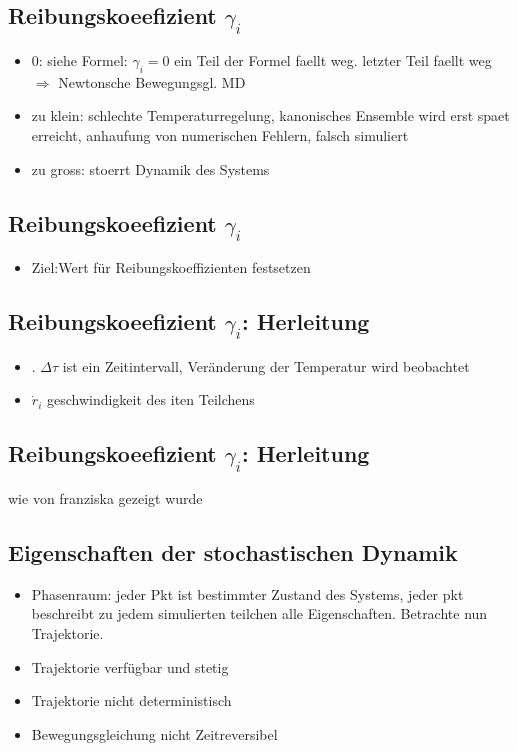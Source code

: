 \documentclass[]{article}
\begin{document}
\subsection{Reibungskoeefizient $\gamma_i$} 
\begin{itemize}
	\item 0: siehe Formel: $\gamma_i=0$ ein Teil der Formel faellt weg. letzter Teil faellt weg  $\Rightarrow$ Newtonsche Bewegungsgl. MD %
	\item zu klein: schlechte Temperaturregelung, kanonisches Ensemble wird erst spaet erreicht, anhaufung von numerischen Fehlern, falsch simuliert
	\item zu gross: stoerrt Dynamik des Systems 
\end{itemize}

\subsection{Reibungskoeefizient $\gamma_i$} 
\begin{itemize}
	\item Ziel:Wert für Reibungskoeffizienten festsetzen
\end{itemize}

\subsection{Reibungskoeefizient $\gamma_i$: Herleitung} 
\begin{itemize}
	\item . $\Delta \tau$ ist ein Zeitintervall, Veränderung der Temperatur  wird beobachtet
	\item $\dot{r}_i$ geschwindigkeit des iten Teilchens
\end{itemize}

\subsection{Reibungskoeefizient $\gamma_i$: Herleitung} 
wie von franziska gezeigt wurde

\subsection{Eigenschaften der stochastischen Dynamik}
\begin{itemize}
	\item Phasenraum: jeder Pkt ist bestimmter Zustand des Systems, jeder pkt beschreibt zu jedem simulierten teilchen alle Eigenschaften. Betrachte nun Trajektorie. 
	\item Trajektorie verfügbar und stetig %
	\item Trajektorie nicht deterministisch   %
	\item Bewegungsgleichung nicht Zeitreversibel %
\end{itemize}
\end{document}
